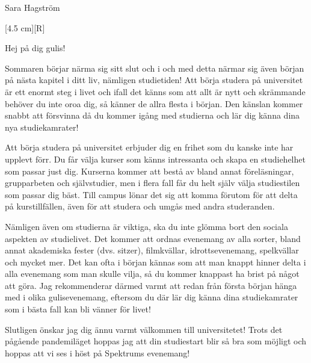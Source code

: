 \documentclass{spektraklet}
\begin{document}
\begin{ordforandespalten}{Sara Hagström}

[4.5 cm][R]

Hej på dig gulis!

Sommaren börjar närma sig sitt slut och i och med detta närmar sig även början på nästa kapitel i ditt liv, nämligen studietiden! Att börja studera på universitet är ett enormt steg i livet och ifall det känns som att allt är nytt och skrämmande behöver du inte oroa dig, så känner de allra flesta i början. Den känslan kommer snabbt att försvinna då du kommer igång med studierna och lär dig känna dina nya studiekamrater!

Att börja studera på universitet erbjuder dig en frihet som du kanske inte har upplevt förr. Du får välja kurser som känns intressanta och skapa en studiehelhet som passar just dig. Kurserna kommer att bestå av bland annat föreläsningar, grupparbeten och självstudier, men i flera fall får du helt själv välja studiestilen som passar dig bäst. Till campus lönar det sig att komma förutom för att delta på kurstillfällen, även för att studera och umgås med andra studeranden. 

Nämligen även om studierna är viktiga, ska du inte glömma bort den sociala aspekten av studielivet. Det kommer att ordnas evenemang av alla sorter, bland annat akademiska fester (dvs. sitzer), filmkvällar, idrottsevenemang, spelkvällar och mycket mer. Det kan ofta i början kännas som att man knappt hinner delta i alla evenemang som man skulle vilja, så du kommer knappast ha brist på något att göra. Jag rekommenderar därmed varmt att redan från första början hänga med i olika gulisevenemang, eftersom du där lär dig känna dina studiekamrater som i bästa fall kan bli vänner för livet!

Slutligen önskar jag dig ännu varmt välkommen till universitetet! Trots det pågående pandemiläget hoppas jag att din studiestart blir så bra som möjligt och hoppas att vi ses i höst på Spektrums evenemang!


\end{ordforandespalten}
\end{document}
